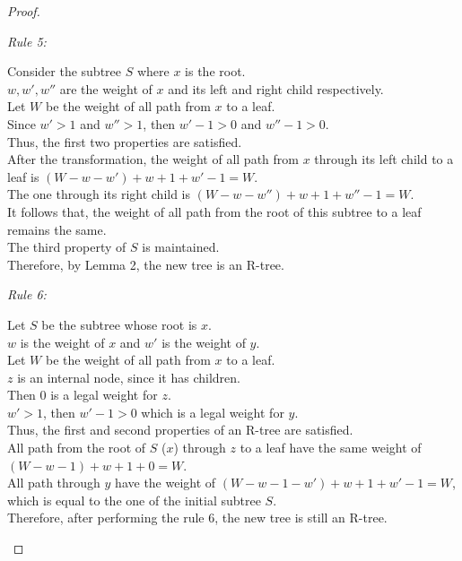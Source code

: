 \documentclass[10pt]{article}
\begin{document}
\begin{enumerate}
\begin{proof}
\begin{addmargin}[1em]{0em}
		\textit{Rule 5:}
		\begin{addmargin}[1em]{0em}
			Consider the subtree $S$ where $x$ is the root. \\
			$w, w', w''$ are the weight of $x$ and its left and right child
			respectively. \\
			Let $W$ be the weight of all path from $x$ to a leaf. \\
			Since $w' > 1$ and $w'' > 1$, then $w'-1 > 0$ and $w''-1 > 0$. \\
			Thus, the first two properties are satisfied. \\
			After the transformation, the weight of all path from $x$ through
			its left child to a leaf is $(W - w - w') + w+1 + w'-1 = W$. \\
			The one through its right child is $(W - w - w'') + w+1 + w''-1 =
			W$. \\
			It follows that, the weight of all path from the root of this
			subtree to a leaf remains the same. \\
			The third property of $S$ is maintained. \\
			Therefore, by Lemma 2, the new tree is an R-tree.
		\end{addmargin}

		\textit{Rule 6:}
		\begin{addmargin}[1em]{0em}
			Let $S$ be the subtree whose root is $x$. \\
			$w$ is the weight of $x$ and $w'$ is the weight of $y$. \\
			Let $W$ be the weight of all path from $x$ to a leaf. \\
			$z$ is an internal node, since it has children. \\
			Then 0 is a legal weight for $z$. \\
			$w' > 1$, then $w'-1 > 0$ which is a legal weight for $y$. \\
			Thus, the first and second properties of an R-tree are satisfied. \\
			All path from the root of $S$ ($x$) through $z$ to a leaf have the
			same weight of $(W-w-1) + w+1 + 0 = W$. \\
			All path through $y$ have the weight of $(W-w-1-w') + w+1 + w'-1 =
			W$, which is equal to the one of the initial subtree $S$. \\
			Therefore, after performing the rule 6, the new tree is still an
			R-tree.
		\end{addmargin}


\end{addmargin}
\end{proof}
\end{enumerate}
\end{document}
